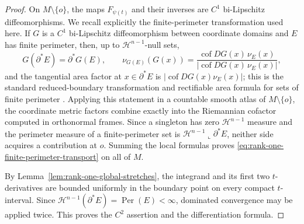 \documentclass[11pt,reqno]{amsart}
\numberwithin{equation}{section}
\theoremstyle{definition}
\theoremstyle{remark}
\newcommand{\Per}{\operatorname{Per}}
\newcommand{\cof}{\operatorname{cof}}
\begin{document}
\begin{proof}
On $M\setminus\{o\}$, the maps $F_{\psi(t)}$ and their inverses are $C^1$
bi-Lipschitz diffeomorphisms.  We recall explicitly the finite-perimeter
transformation used here.  If $G$ is a $C^1$ bi-Lipschitz diffeomorphism between
coordinate domains and $E$ has finite perimeter, then, up to
$\mathcal H^{n-1}$-null sets,
\[
G(\partial^*E)=\partial^*G(E),
\qquad
\nu_{G(E)}(G(x))
=
\frac{\cof DG(x)\,\nu_E(x)}{|\cof DG(x)\,\nu_E(x)|},
\]
and the tangential area factor at $x\in\partial^*E$ is
$|\cof DG(x)\nu_E(x)|$; this is the standard reduced-boundary transformation
and rectifiable area formula for sets of finite perimeter
\cite{AFP2000,Maggi2012}.  Applying this statement in a countable smooth atlas
of $M\setminus\{o\}$, the coordinate metric factors combine exactly into the
Riemannian cofactor computed in orthonormal frames.  Since a singleton has zero
$\mathcal H^{n-1}$ measure and the perimeter measure of a finite-perimeter set
is $\mathcal H^{n-1}\llcorner\partial^*E$, neither side acquires a contribution
at $o$.  Summing the local formulas proves
\eqref{eq:rank-one-finite-perimeter-transport} on all of $M$.

By Lemma~\ref{lem:rank-one-global-stretches}, the integrand and its first two
$t$-derivatives are bounded uniformly in the boundary point on every compact
$t$-interval.  Since
$\mathcal H^{n-1}(\partial^*E)=\Per(E)<\infty$, dominated convergence may be
applied twice.  This proves the $C^2$ assertion and the differentiation
formula.
\end{proof}
\end{document}
